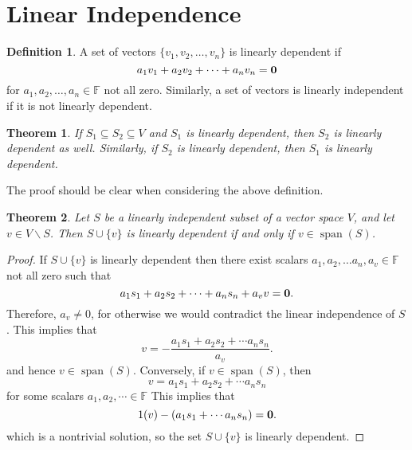 \documentclass[oneside, 12pt]{book}
\DeclareMathOperator{\spn}{span}
\newtheorem{thm}{Theorem}[section]
\theoremstyle{definition}
\newtheorem{defn}{Definition}[section]
\begin{document}
\section{Linear Independence}
\begin{defn}
\label{defn_linind}
  A set of vectors $\{v_{1}, v_{2}, \dots, v_{n}\}$ is linearly dependent if
  \[a_{1}v_{1}+a_{2}v_{2}+ \dots +a_{n}v_{n}=\bold{0}\] for $a_{1}, a_{2}, \dots ,a_{n} \in \mathbb{F}$ not all zero. Similarly, a set of vectors is linearly independent if it is not linearly dependent.
\end{defn}
\begin{thm}
\label{thm_linind}
If $S_{1}\subseteq S_{2} \subseteq V$ and $S_{1}$ is linearly dependent, then $S_{2}$ is linearly dependent as well. Similarly, if $S_{2}$ is linearly dependent, then $S_{1}$ is linearly dependent.
\end{thm}
The proof should be clear when considering the above definition.
\begin{thm}
\label{thm_span}
Let $S$ be a linearly independent subset of a vector space $V$, and let $v \in V \backslash S$. Then $S \cup \{v\}$ is linearly dependent if and only if $v \in \spn(S)$.
\end{thm}
\begin{proof}
  If $S \cup \{v\}$ is linearly dependent then there exist scalars $a_{1}, a_{2}, \dots a_{n}, a_{v} \in \mathbb{F}$ not all zero such that \[a_{1}s_{1} +a_{2}s_{2}+\cdots +a_{n}s_{n}+a_{v}v=\bold{0}.\]
  Therefore, $a_{v}\neq0$, for otherwise we would contradict the linear independence of $S$. This implies that \[v=-\frac{a_{1}s_{1}+ a_{2}s_{2}+ \cdots a_{n}s_{n}}{a_{v}}.\] and hence $v \in \spn(S)$. Conversely, if $v \in \spn(S)$, then \[v=a_{1}s_{1}+a_{2}s_{2}+\cdots a_{n}s_{n} \] for some scalars $a_{1},a_{2}, \cdots \in \mathbb{F}$ This implies that \[1(v)-(a_{1}s_{1}+\cdots a_{n}s_{n})=\bold{0}.\] which is a nontrivial solution, so the set $S \cup \{v\}$ is linearly dependent.
\end{proof}
\end{document}
